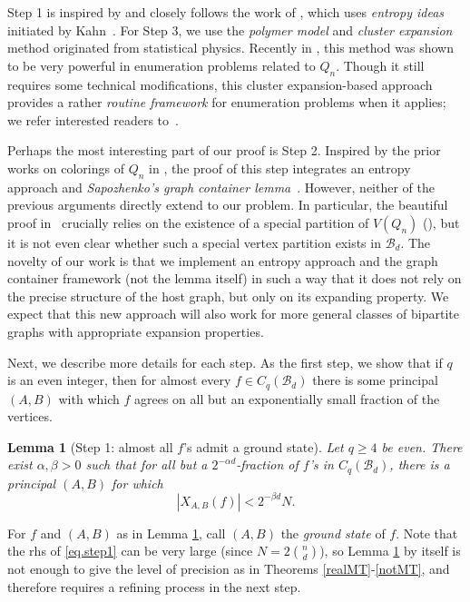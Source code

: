\documentclass{amsart}
\newtheorem{lem}[thm]{Lemma}
\theoremstyle{definition}
\newcommand{\cB}{\mathcal{B} }
\newcommand{\beq}[1]{\begin{equation}\label{#1}}
\newcommand{\enq}[0]{\end{equation}}
\newcommand{\0}[0]{\emptyset}
\begin{document}
Step 1 is inspired by and closely follows the work of \cite{EG, Kahn}, which uses \textit{entropy ideas} initiated by Kahn~\cite{Kahn}. 
For Step 3, we use the \textit{polymer model} and \textit{cluster expansion} method originated from statistical physics. Recently in \cite{JP}, this method was shown to be very powerful in enumeration problems related to $Q_n$. Though it still requires some technical modifications, this cluster expansion-based approach provides a rather \textit{routine framework} for  enumeration problems when it applies; we refer interested readers to~\cite{BGL, JK}.

Perhaps the most interesting part of our proof is Step 2. 
Inspired by the prior works on colorings of $Q_n$ in \cite{JK, KPq}, the proof of this step integrates an entropy approach and \textit{Sapozhenko’s graph container lemma}~\cite{Sap87}.
However,  neither of the previous arguments directly extend to our problem. In particular, the beautiful proof in~\cite{JK} crucially relies on the existence of a special partition of $V(Q_n)$ (\cite[Lemma 8.1]{JK}), but it is not even clear whether such a special vertex partition exists in $\cB_d$.
The {novelty} of our work is that we implement an entropy approach and the graph container framework (not the lemma itself) in such a way that it does not rely on the precise structure of the host graph, but only on its expanding property. We expect that this new approach will also work for more general classes of bipartite graphs with appropriate expansion properties.

Next, we describe more details for each step. As the first step, we show that if $q$ is an even integer, then for almost every $f \in C_q(\cB_d)$ there is some principal $(A,B)$ with which $f$ agrees on all but an exponentially small fraction of the vertices.

\begin{lem}[Step 1: almost all $f$'s admit a ground state]\label{lem.step1} Let $q \ge 4$ be even. 
There exist $\alpha, \beta >0$ such that for all but a $2^{-\alpha d}$-fraction of $f$'s in $C_q(\cB_d)$, there is a principal $(A,B)$ for which
\beq{eq.step1} |X_{A,B}(f)|<2^{-\beta d}N.\enq
\end{lem}

For $f$ and $(A,B)$ as in Lemma \ref{lem.step1}, call $(A,B)$ the \textit{ground state} of $f$. Note that the rhs of \eqref{eq.step1} can be very large (since $N =2{n \choose d}$), so Lemma \ref{lem.step1} by itself is not enough to give the level of precision as in Theorems \ref{realMT}-\ref{notMT}, and therefore requires a refining process in the next step.
\end{document}

